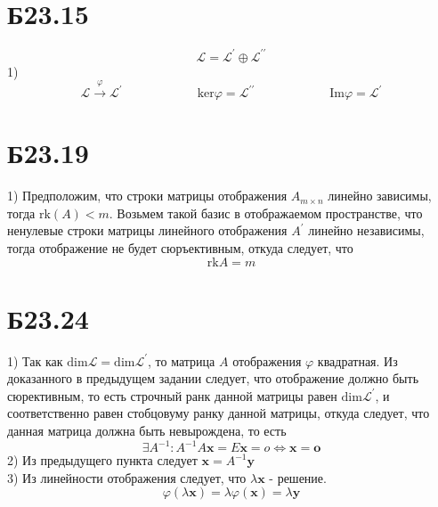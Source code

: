 \documentclass[a4paper,12pt]{article} %
\begin{document}
\section*{Б23.15}$$\mathcal{L}=\mathcal{L}^{\prime}\oplus\mathcal{L}^{\prime\prime}$$1)
$$\mathcal{L}\overset{\varphi}{\to}\mathcal{L}^{\prime}\qquad\qquad\qquad\mathrm{ker}\varphi=\mathcal{L}^{\prime\prime}\qquad\qquad\qquad\mathrm{Im}\varphi=\mathcal{L}^{\prime}$$
\section*{Б23.19}1)
Предположим, что строки матрицы отображения $A_{m\times n}$ линейно зависимы, тогда $\mathrm{rk}(A)<m$. Возьмем такой базис в отображаемом пространстве, что ненулевые строки матрицы линейного отображения $A^{\prime}$ линейно независимы, тогда отображение не будет сюръективным, откуда следует, что $$\mathrm{rk}A=m$$
\section*{Б23.24}
1) Так как $\mathrm{dim}\mathcal{L}=\mathrm{dim}\mathcal{L}^{\prime}$, то матрица $A$ отображения $\varphi$ квадратная. Из доказанного в предыдущем задании следует, что отображение должно быть сюрективным, то есть строчный ранк данной матрицы равен $\mathrm{dim}\mathcal{L}^{\prime}$, и соответственно равен стобцовуму ранку данной матрицы, откуда следует, что данная матрица должна быть невырождена, то есть $$\exists A^{-1}:A^{-1}A\textbf{x}=E\textbf{x}=o\Leftrightarrow \textbf{x}=\textbf{o}$$
2) Из предыдущего пункта следует $\textbf{x}=A^{-1}\textbf{y}$\\
3) Из линейности отображения следует, что $\lambda \textbf{x}$ - решение.$$\varphi(\lambda\textbf{x})=\lambda\varphi(\textbf{x})=\lambda \textbf{y}$$
\end{document}
